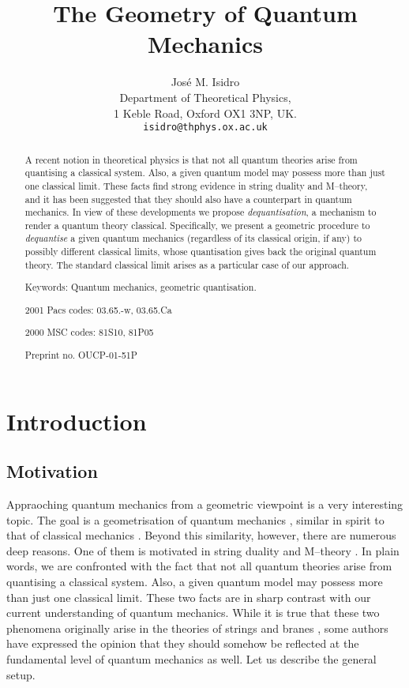\documentclass[a4paper,a4paper]{article}
\begin{document}
\title{The Geometry of Quantum Mechanics}
\author{Jos\'e M. Isidro\\
Department of Theoretical Physics,\\ 
1 Keble Road, 
Oxford OX1 3NP, UK.\\ 
{\tt isidro@thphys.ox.ac.uk}}
\maketitle

\begin{abstract}

A recent notion in theoretical physics is that not all quantum theories arise 
from quantising a classical system. Also, a given quantum model may possess more 
than just one classical limit. These facts find strong evidence in string 
duality and M--theory, and it has been suggested that they should also 
have a counterpart in quantum mechanics. In view of these developments 
we propose {\it dequantisation}, a mechanism to render a quantum theory 
classical. Specifically, we present a geometric procedure to {\it dequantise}
a given quantum mechanics (regardless of its classical origin, if any) 
to possibly different classical limits, whose quantisation gives back 
the original quantum theory. The standard classical limit \coordHE{} 
arises as a particular case of our approach.

Keywords: Quantum mechanics, geometric quantisation.

2001 Pacs codes: 03.65.-w, 03.65.Ca

2000 MSC codes: 81S10, 81P05

Preprint no. OUCP-01-51P

\end{abstract}

\tableofcontents

\section{Introduction}\label{intro}

\subsection{Motivation}\label{moti}

Appraoching quantum mechanics from a geometric viewpoint is a very interesting 
topic. The goal is a geometrisation of quantum mechanics \cite{ASHTEKAR},
similar in spirit to that of classical mechanics \cite{ARNOLD, RATIU}. 
Beyond this similarity, however, there are numerous deep reasons. 
One of them is motivated in string duality and M--theory \cite{SCHWARZ, VAFA}. 
In plain words, we are confronted with the fact that not all quantum theories 
arise from quantising a classical system. Also, a given quantum model may possess 
more than just one classical limit. These two facts are in sharp contrast with our 
current understanding of quantum mechanics. While it is true that these two phenomena 
originally arise in the theories of strings and branes \cite{KAKU}, 
some authors \cite{VAFA} have expressed the opinion that they should 
somehow be reflected at the fundamental level of quantum mechanics as well. 
Let us describe the general setup.
 
\end{document}
